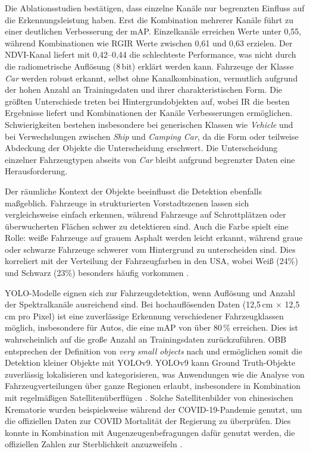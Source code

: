 Die Ablationsstudien bestätigen, dass einzelne Kanäle nur begrenzten Einfluss auf die Erkennungsleistung haben. Erst die Kombination mehrerer Kanäle führt zu einer deutlichen Verbesserung der mAP. Einzelkanäle erreichen Werte unter 0,55, während Kombinationen wie  RGIR Werte zwischen 0,61 und 0,63 erzielen. Der NDVI-Kanal liefert mit 0,42–0,44 die schlechteste Performance, was nicht durch die radiometrische Auflösung (8\,bit) erklärt werden kann. Fahrzeuge der Klasse \emph{Car} werden robust erkannt, selbst ohne Kanalkombination, vermutlich aufgrund der hohen Anzahl an Trainingsdaten und ihrer charakteristischen Form. Die größten Unterschiede treten bei Hintergrundobjekten auf, wobei IR die besten Ergebnisse liefert und Kombinationen der Kanäle Verbesserungen ermöglichen. Schwierigkeiten bestehen insbesondere bei generischen Klassen wie \emph{Vehicle} und bei Verwechslungen zwischen \emph{Ship} und \emph{Camping Car}, da die Form oder teilweise Abdeckung der Objekte die Unterscheidung erschwert. Die Unterscheidung einzelner Fahrzeugtypen abseits von \emph{Car} bleibt aufgrund begrenzter Daten eine Herausforderung.

Der räumliche Kontext der Objekte beeinflusst die Detektion ebenfalls maßgeblich. Fahrzeuge in strukturierten Vorstadtszenen lassen sich vergleichsweise einfach erkennen, während Fahrzeuge auf Schrottplätzen oder überwucherten Flächen schwer zu detektieren sind. Auch die Farbe spielt eine Rolle: weiße Fahrzeuge auf grauem Asphalt werden leicht erkannt, während graue oder schwarze Fahrzeuge schwerer vom Hintergrund zu unterscheiden sind. Dies korreliert mit der Verteilung der Fahrzeugfarben in den USA, wobei Weiß (24\%) und Schwarz (23\%) besonders häufig vorkommen \cite{abc_utah}.

YOLO-Modelle  eignen sich zur Fahrzeugdetektion, wenn Auflösung und Anzahl der Spektralkanäle ausreichend sind. Bei hochauflösenden Daten (12,5\,cm $\times$ 12,5\,cm pro Pixel) ist eine zuverlässige Erkennung verschiedener Fahrzeugklassen möglich, insbesondere für Autos, die eine mAP von über 80\,\% erreichen. Dies ist wahrscheinlich auf die große Anzahl an Trainingsdaten zurückzuführen. OBB entsprechen der Definition von \emph{very small objects} nach \cite{Chen2017} und ermöglichen somit die Detektion kleiner Objekte mit YOLOv9.  YOLOv9 kann Ground Truth-Objekte zuverlässig lokalisieren und kategorisieren, was Anwendungen wie die Analyse von Fahrzeugverteilungen über ganze Regionen erlaubt, insbesondere in Kombination mit regelmäßigen Satellitenüberflügen \cite{planet_labs, airbus_neo}.  Solche Satellitenbilder von chinesischen Krematorie wurden beispielsweise während der COVID-19-Pandemie genutzt, um die offiziellen Daten zur
COVID Mortalität der Regierung zu überprüfen. Dies konnte in Kombination mit Augenzeugenbefragungen dafür genutzt werden, die offiziellen Zahlen zur Sterblichkeit anzuzweifeln  \cite{Spiegel_article}. 

